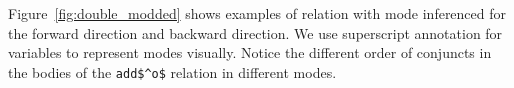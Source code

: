 Figure~\ref{fig:double_modded} shows examples of \mk relation with mode inferenced for the forward direction and backward direction. 
We use superscript annotation for variables to represent modes visually. 
Notice the different order of conjuncts in the bodies of the \lstinline{add$^o$} relation in different modes. 





